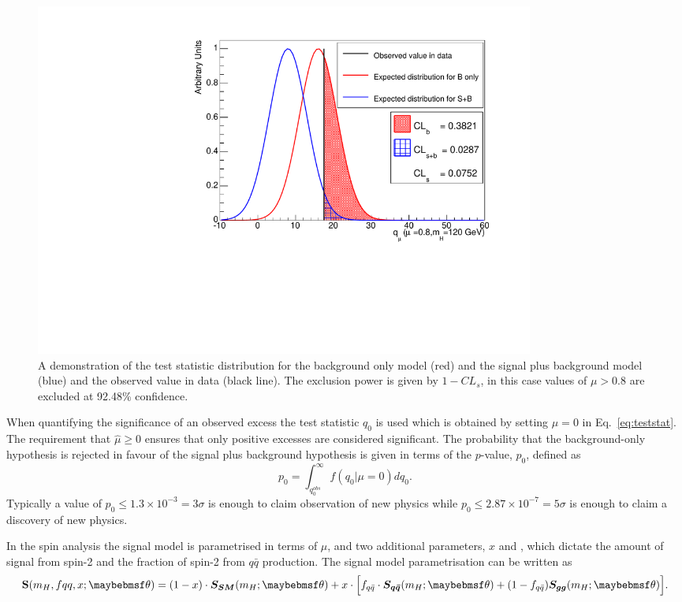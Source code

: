 \begin{figure}
  \begin{center}
    \includegraphics[width=0.8\textwidth]{analysis/plots/testStatDrawing.pdf}
    \caption[A demonstration of the test statistic distribution]{A demonstration of the test statistic distribution for the background only model (red) and the signal plus background model (blue) and the observed value in data (black line). The exclusion power is given by $1-CL_{s}$, in this case values of $\mu>0.8$ are excluded at 92.48\% confidence.}
    \label{fig:cls}
  \end{center}
\end{figure}

When quantifying the significance of an observed excess the test statistic $q_{0}$ is used which is obtained by setting $\mu=0$ in Eq.~\ref{eq:teststat}. The requirement that $\hat{\mu}\geq0$ ensures that only positive excesses are considered significant. The probability that the background-only hypothesis is rejected in favour of the signal plus background hypothesis is given in terms of the $p$-value, $p_{0}$, defined as
\begin{equation}
  p_{0} = \int_{q_{0}^{obs}}^{\infty}f(q_{0}|\mu=0)dq_{0}.
  \label{eq:pvalue}
\end{equation}
Typically a value of $p_{0}\leq1.3\times10^{-3}=3\sigma$ is enough to claim observation of new physics while $p_{0}\leq2.87\times10^{-7}=5\sigma$ is enough to claim a discovery of new physics.

In the spin analysis the signal model is parametrised in terms of $\mu$, \mH and two additional parameters, $x$ and \fqqbar, which dictate the amount of signal from spin-2 and the fraction of spin-2 from $q\bar{q}$ production. The signal model parametrisation can be written as
\begin{equation}
  \textbf{S}(m_{H},fqq,x;\theta) = (1-x)\cdot\boldsymbol{S_{SM}}(m_{H};\theta)  + x\cdot\Bigl[f_{q\bar{q}}\cdot \boldsymbol{S_{q\bar{q}}}(m_{H};\theta) + (1-f_{q\bar{q}})\boldsymbol{S_{gg}}(m_{H};\theta)\Bigr].  
  \label{eq:spin_sig}
\end{equation}

